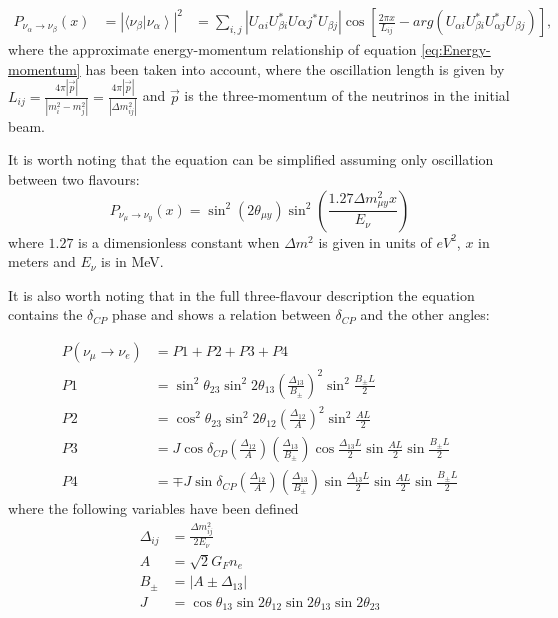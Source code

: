 \begin{equation}
\label{eq:Problength}
\begin{aligned}
P_{\nu_\alpha \rightarrow \nu_\beta} (x) &= \left|  \langle \nu_\beta \left| \nu_\alpha     \right\rangle  \right|^2
& = \sum_{i,j} \left| U_{\alpha i} U_{\beta i}^* U{\alpha j}^* U_{\beta j} \right| \cos\left[\frac{2\pi x}{L_{ij}} -arg(U_{\alpha i} U_{\beta i}^* U_{\alpha j}^* U_{\beta j} ) \right],
\end{aligned}
\end{equation}
where the approximate energy-momentum relationship of equation \ref{eq:Energy-momentum} has been taken into account, where the oscillation length is given by $L_{ij} = \frac{4\pi  \left| \vec{p} \right| }{\left| m_i^2 - m_j^2 \right|}=\frac{4\pi  \left| \vec{p} \right| }{\left| \Delta m_{ij}^2 \right|} $ and $\vec{p}$ is the three-momentum of the neutrinos in the initial beam.

It is worth noting that the equation can be simplified assuming only oscillation between two flavours:
\begin{equation}
P_{\nu_\mu \rightarrow \nu_y} (x) = \sin^2(2\theta_{\mu y})\sin^2 \left( \frac{1.27\Delta m_{\mu y}^2 x}{E_\nu} \right)
\label{eq:twoPNeutrinoosc}
\end{equation}
where $1.27$ is a dimensionless constant when $\Delta m^2$ is given in units of $eV^2$, $x$ in meters and $E_\nu$ is in MeV.

It is also worth noting that in the full three-flavour description the equation contains the $\delta_{CP}$ phase and shows a relation between $\delta_{CP}$ and the other angles:

\begin{align}
P(\nu_\mu \rightarrow \nu_e) &= P1 + P2 + P3 + P4 \label{eq:alignThreeFlavour}\\
P1 &= \sin^2 \theta_{23} \sin^2 2\theta_{13} (\frac{\Delta_{13}}{B_\pm})^2 \sin^2 \frac{B_\pm L}{2} \\
P2 &= \cos^2 \theta_{23} \sin^2 2\theta_{12} (\frac{\Delta_{12}}{A})^2 \sin^2 \frac{A L}{2} \\
P3 &= J\cos \delta_{CP} (\frac{\Delta_{12}}{A})(\frac{\Delta_{13}}{B_\pm})\cos \frac{\Delta_{13} L}{2}\sin \frac{A L}{2}\sin \frac{B_\pm L}{2} \\
P4 &= \mp J\sin \delta_{CP} (\frac{\Delta_{12}}{A})(\frac{\Delta_{13}}{B_\pm})\sin \frac{\Delta_{13} L}{2}\sin \frac{A L}{2}\sin \frac{B_\pm L}{2}
\end{align}
where the following variables have been defined
\begin{align}
\Delta_{ij} &= \frac{\Delta m^2_{ij}}{2E_\nu} \\
A &= \sqrt{2} G_F n_e \\
B_\pm &= | A \pm \Delta_{13} | \\
J &= \cos\theta_{13}\sin 2\theta_{12}\sin 2\theta_{13}\sin 2\theta_{23}
\end{align}

